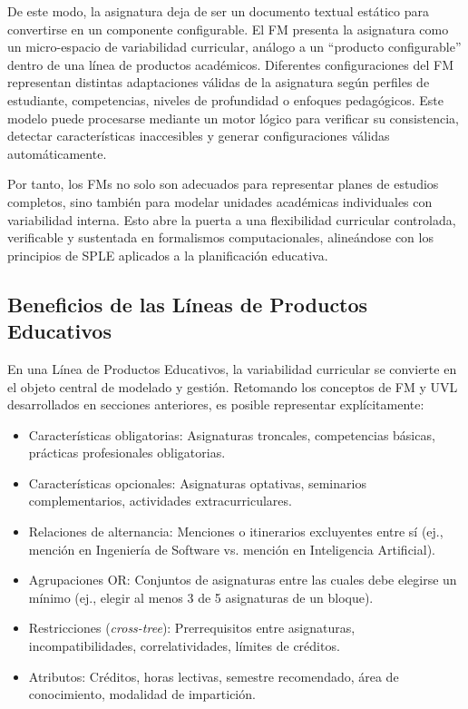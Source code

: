 De este modo, la asignatura deja de ser un documento textual estático para 
convertirse en un componente configurable. El \ac{FM} presenta la asignatura como un 
micro-espacio de variabilidad curricular, análogo a un “producto configurable” 
dentro de una línea de productos académicos. Diferentes configuraciones del \ac{FM} 
representan distintas adaptaciones válidas de la asignatura según perfiles de 
estudiante, competencias, niveles de profundidad o enfoques pedagógicos. 
Este modelo puede procesarse mediante un motor lógico para verificar su 
consistencia, detectar características inaccesibles y generar 
configuraciones válidas automáticamente.

Por tanto, los \ac{FM}s no solo son adecuados 
para representar planes de estudios completos, sino también para modelar unidades 
académicas individuales con variabilidad interna. Esto abre la puerta a una 
flexibilidad curricular controlada, verificable y sustentada en formalismos 
computacionales, alineándose con los principios de \ac{SPLE} 
aplicados a la planificación educativa.


\subsection{Beneficios de las Líneas de Productos Educativos}

En una Línea de Productos Educativos, la variabilidad curricular se convierte 
en el objeto central de modelado y gestión. Retomando los conceptos de \ac{FM} y 
\ac{UVL} desarrollados en secciones anteriores, es posible representar explícitamente:

\begin{itemize}
    \item Características obligatorias: Asignaturas troncales, competencias básicas, prácticas profesionales obligatorias.
    \item Características opcionales: Asignaturas optativas, seminarios complementarios, actividades extracurriculares.
    \item Relaciones de alternancia: Menciones o itinerarios excluyentes entre sí (ej., mención en Ingeniería de Software vs. mención en Inteligencia Artificial).
    \item Agrupaciones OR: Conjuntos de asignaturas entre las cuales debe elegirse un mínimo (ej., elegir al menos 3 de 5 asignaturas de un bloque).
    \item Restricciones (\textit{cross-tree}): Prerrequisitos entre asignaturas, incompatibilidades, correlatividades, límites de créditos.
    \item Atributos: Créditos, horas lectivas, semestre recomendado, área de conocimiento, modalidad de impartición.
\end{itemize}


